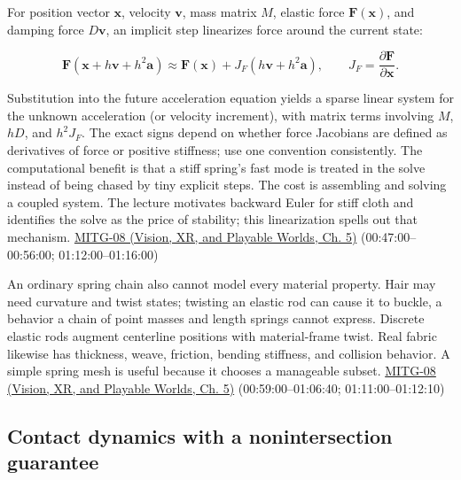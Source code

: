 For position vector \(\boldsymbol{x}\), velocity \(\boldsymbol{v}\), mass matrix \(M\), elastic force \(\boldsymbol{F}(\boldsymbol{x})\), and damping force \(D\boldsymbol{v}\), an implicit step linearizes force around the current state:

\[
\boldsymbol{F}(\boldsymbol{x}+h\boldsymbol{v}+h^2\boldsymbol{a})
\approx \boldsymbol{F}(\boldsymbol{x})
+J_F(h\boldsymbol{v}+h^2\boldsymbol{a}),
\qquad J_F=\frac{\partial \boldsymbol{F}}{\partial \boldsymbol{x}}.
\]

Substitution into the future acceleration equation yields a sparse linear system for the unknown acceleration (or velocity increment), with matrix terms involving \(M\), \(hD\), and \(h^2J_F\). The exact signs depend on whether force Jacobians are defined as derivatives of force or positive stiffness; use one convention consistently. The computational benefit is that a stiff spring's fast mode is treated in the solve instead of being chased by tiny explicit steps. The cost is assembling and solving a coupled system. The lecture motivates backward Euler for stiff cloth and identifies the solve as the price of stability; this linearization spells out that mechanism. \href{../07-Vision-XR-and-Playable-Worlds/main.pdf\#nameddest=04-visual-computing-ii-ch036-mitg-08---cloth-simulation}{MITG-08 (Vision, XR, and Playable Worlds, Ch. 5)} (00:47:00--00:56:00; 01:12:00--01:16:00)

An ordinary spring chain also cannot model every material property. Hair may need curvature and twist states; twisting an elastic rod can cause it to buckle, a behavior a chain of point masses and length springs cannot express. Discrete elastic rods augment centerline positions with material-frame twist. Real fabric likewise has thickness, weave, friction, bending stiffness, and collision behavior. A simple spring mesh is useful because it chooses a manageable subset. \href{../07-Vision-XR-and-Playable-Worlds/main.pdf\#nameddest=04-visual-computing-ii-ch036-mitg-08---cloth-simulation}{MITG-08 (Vision, XR, and Playable Worlds, Ch. 5)} (00:59:00--01:06:40; 01:11:00--01:12:10)

\subsection{Contact dynamics with a nonintersection guarantee}\label{04-visual-computing-ii-ch029-contact-dynamics-with-a-nonintersection-guarantee}

\hypertarget{04-visual-computing-ii-ch029-contact-dynamics-with-a-nonintersection-guarantee}{}


